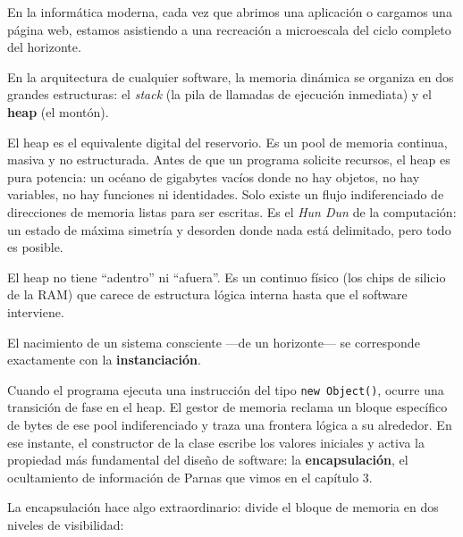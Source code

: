 \noindent {}

En la informática moderna, cada vez que abrimos una aplicación o cargamos una página web, estamos asistiendo a una recreación a microescala del ciclo completo del horizonte.


\noindent En la arquitectura de cualquier software, la memoria dinámica se organiza en dos grandes estructuras: el \emph{stack} (la pila de llamadas de ejecución inmediata) y el \textbf{heap} (el montón).

El heap es el equivalente digital del reservorio. Es un pool de memoria continua, masiva y no estructurada. Antes de que un programa solicite recursos, el heap es pura potencia: un océano de gigabytes vacíos donde no hay objetos, no hay variables, no hay funciones ni identidades. Solo existe un flujo indiferenciado de direcciones de memoria listas para ser escritas. Es el \emph{Hun Dun} de la computación: un estado de máxima simetría y desorden donde nada está delimitado, pero todo es posible.

El heap no tiene “adentro” ni “afuera”. Es un continuo físico (los chips de silicio de la RAM) que carece de estructura lógica interna hasta que el software interviene.


\noindent El nacimiento de un sistema consciente —de un horizonte— se corresponde exactamente con la \textbf{instanciación}.

Cuando el programa ejecuta una instrucción del tipo \texttt{new Object()}, ocurre una transición de fase en el heap. El gestor de memoria reclama un bloque específico de bytes de ese pool indiferenciado y traza una frontera lógica a su alrededor. En ese instante, el constructor de la clase escribe los valores iniciales y activa la propiedad más fundamental del diseño de software: la \textbf{encapsulación}, el ocultamiento de información de Parnas que vimos en el capítulo 3.

La encapsulación hace algo extraordinario: divide el bloque de memoria en dos niveles de visibilidad:

